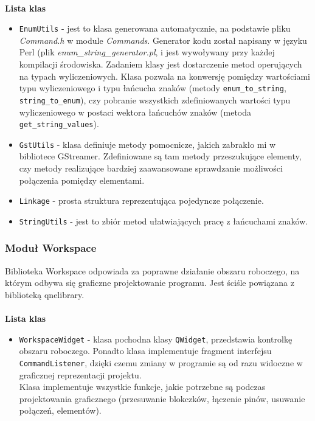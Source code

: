\documentclass[12pt]{article}
\begin{document}
\paragraph{}
\textbf{Lista klas}
\vspace{-2mm}
\begin{itemize}
 \setlength{\itemsep}{0em}
\item \texttt{EnumUtils} - jest to klasa generowana automatycznie, na podstawie pliku \textit{Command.h} w module \textit{Commands}. Generator kodu został napisany w języku Perl (plik \textit{enum\_string\_generator.pl}, i jest wywoływany przy każdej kompilacji środowiska.
Zadaniem klasy jest dostarczenie metod operujących na typach wyliczeniowych. Klasa pozwala na konwersję pomiędzy wartościami typu wyliczeniowego i typu łańcucha znaków (metody \texttt{enum\_to\_string}, \texttt{string\_to\_enum}), czy pobranie wszystkich zdefiniowanych wartości typu wyliczeniowego w postaci wektora łańcuchów znaków (metoda \texttt{get\_string\_values}).
\item \texttt{GstUtils} - klasa definiuje metody pomocnicze, jakich zabrakło mi w bibliotece GStreamer. Zdefiniowane są tam metody przeszukujące elementy, czy metody realizujące bardziej zaawansowane sprawdzanie możliwości połączenia pomiędzy elementami.
\item \texttt{Linkage} - prosta struktura reprezentująca pojedyncze połączenie.
\item \texttt{StringUtils} - jest to zbiór metod ułatwiających pracę z łańcuchami znaków.
\end{itemize}
\subsubsection{Moduł Workspace}
Biblioteka Workspace odpowiada za poprawne działanie obszaru roboczego, na którym odbywa się graficzne projektowanie programu. Jest ściśle powiązana z biblioteką qnelibrary.
\paragraph{}
\textbf{Lista klas}
\vspace{-2mm}
\begin{itemize}
  \setlength{\itemsep}{0em}
\item \texttt{WorkspaceWidget} - klasa pochodna klasy \texttt{QWidget}, przedstawia kontrolkę obszaru roboczego. Ponadto klasa implementuje fragment interfejsu \texttt{CommandListener}, dzięki czemu zmiany w programie są od razu widoczne w graficznej reprezentacji projektu. \\
Klasa implementuje wszystkie funkcje, jakie potrzebne są podczas projektowania graficznego (przesuwanie blokczków, łączenie pinów, usuwanie połączeń, elementów).
\end{itemize}
\cleardoublepage
\end{document}
